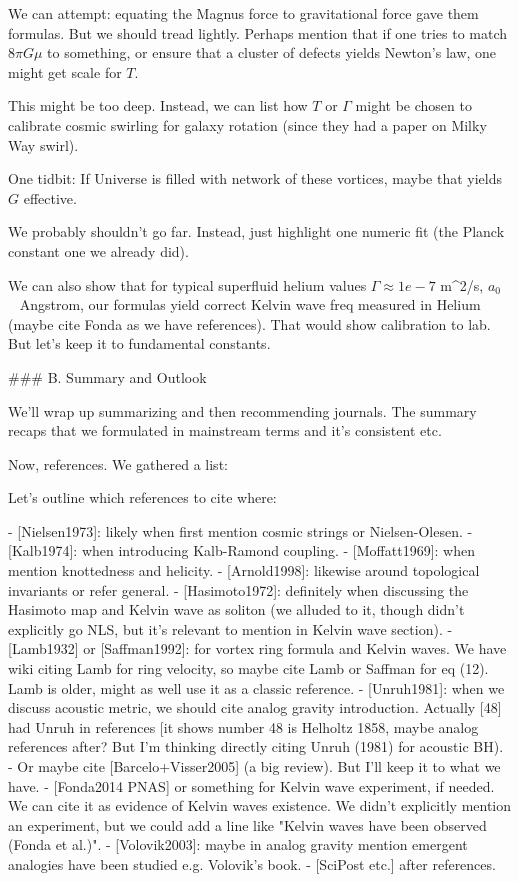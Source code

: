 \documentclass[12pt]{article}
\begin{document}
We can attempt: equating the Magnus force to gravitational force gave them formulas. But we should tread lightly. Perhaps mention that if one tries to match $8\pi G \mu$ to something, or ensure that a cluster of defects yields Newton's law, one might get scale for $T$.

This might be too deep. Instead, we can list how $T$ or $\Gamma$ might be chosen to calibrate cosmic swirling for galaxy rotation (since they had a paper on Milky Way swirl).

One tidbit: If Universe is filled with network of these vortices, maybe that yields $G$ effective.

We probably shouldn't go far. Instead, just highlight one numeric fit (the Planck constant one we already did).

We can also show that for typical superfluid helium values $\Gamma \approx 1e-7$ m^2/s, $a_0$ ~ Angstrom, our formulas yield correct Kelvin wave freq measured in Helium (maybe cite Fonda as we have references). That would show calibration to lab. But let's keep it to fundamental constants.

### B. Summary and Outlook

We'll wrap up summarizing and then recommending journals. The summary recaps that we formulated in mainstream terms and it's consistent etc.

Now, references. We gathered a list:

Let's outline which references to cite where:

- [Nielsen1973]: likely when first mention cosmic strings or Nielsen-Olesen.
- [Kalb1974]: when introducing Kalb-Ramond coupling.
- [Moffatt1969]: when mention knottedness and helicity.
- [Arnold1998]: likewise around topological invariants or refer general.
- [Hasimoto1972]: definitely when discussing the Hasimoto map and Kelvin wave as soliton (we alluded to it, though didn't explicitly go NLS, but it's relevant to mention in Kelvin wave section).
- [Lamb1932] or [Saffman1992]: for vortex ring formula and Kelvin waves. We have wiki citing Lamb for ring velocity, so maybe cite Lamb or Saffman for eq (12).
  Lamb is older, might as well use it as a classic reference.
- [Unruh1981]: when we discuss acoustic metric, we should cite analog gravity introduction. 
  Actually [48] had Unruh in references [it shows number 48 is Helholtz 1858, maybe analog references after? But I'm thinking directly citing Unruh (1981) for acoustic BH).
- Or maybe cite [Barcelo+Visser2005] (a big review).
  But I'll keep it to what we have.
- [Fonda2014 PNAS] or something for Kelvin wave experiment, if needed.
  We can cite it as evidence of Kelvin waves existence. We didn't explicitly mention an experiment, but we could add a line like "Kelvin waves have been observed (Fonda et al.)".
- [Volovik2003]: maybe in analog gravity mention emergent analogies have been studied e.g. Volovik's book. 
- [SciPost etc.] after references.
\end{document}
